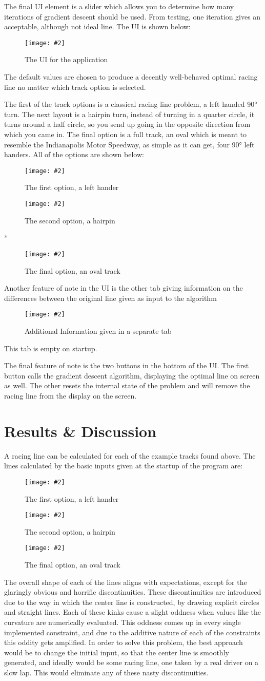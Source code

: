 \documentclass[12pt,twocolumn]{article}
\newcommand{\fig}[3]
{
  \begin{figure}[H]
    \centering
    \texttt{[image: \#2]}
    \caption{#3}
  \end{figure}
}
\begin{document}
The final UI element is a slider which allows you to determine how many iterations of gradient descent should be used. From testing, one iteration gives an acceptable, although not ideal line. The UI is shown below:
\fig{5.0}{controls}{The UI for the application}
The default values are chosen to produce a decently well-behaved optimal racing line no matter which track option is selected.

The first of the track options is a classical racing line problem, a left handed \ang{90} turn. The next layout is a hairpin turn, instead of turning in a quarter circle, it turns around a half circle, so you send up going in the opposite direction from which you came in. The final option is a full track, an oval which is meant to resemble the Indianapolis Motor Speedway, as simple as it can get, four \ang{90} left handers. All of the options are shown below:
\fig{6.0}{lefthander}{The first option, a left hander}
\fig{6.0}{hairpin}{The second option, a hairpin}
\vfill{*}
\fig{8.0}{oval}{The final option, an oval track}

Another feature of note in the UI is the other tab giving information on the differences between the original line given as input to the algorithm
\fig{8.0}{UI2}{Additional Information given in a separate tab}

This tab is empty on startup.

The final feature of note is the two buttons in the bottom of the UI. The first button calls the gradient descent algorithm, displaying the optimal line on screen as well. The other resets the internal state of the problem and will remove the racing line from the display on the screen.
\section{Results \& Discussion}
A racing line can be calculated for each of the example tracks found above. The lines calculated by the basic inputs given at the startup of the program are:
\fig{6.0}{rline3}{The first option, a left hander}
\fig{6.0}{rline2}{The second option, a hairpin}
\fig{8.0}{rline1}{The final option, an oval track}

The overall shape of each of the lines aligns with expectations, except for the glaringly obvious and horrific discontinuities. These discontinuities are introduced due to the way in which the center line is constructed, by drawing explicit circles and straight lines. Each of these kinks cause a slight oddness when values like the curvature are numerically evaluated. This oddness comes up in every single implemented constraint, and due to the additive nature of each of the constraints this oddity gets amplified. In order to solve this problem, the best approach would be to change the initial input, so that the center line is smoothly generated, and ideally would be some racing line, one taken by a real driver on a slow lap. This would eliminate any of these nasty discontinuities.
\end{document}
